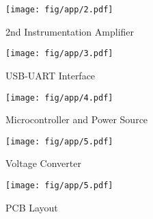 \begin{figure}[h]
	\begin{center}
	\texttt{[image: fig/app/2.pdf]}
	\end{center}
	\vspace{-4mm}
	\caption[2nd Instrumentation Amplifier]
	{2nd Instrumentation Amplifier}
	\label{fig:app2}
	\vspace{-2mm}
\end{figure}
\begin{figure}[h]
	\begin{center}
	\texttt{[image: fig/app/3.pdf]}
	\end{center}
	\vspace{-4mm}
	\caption[USB-UART Interface]
	{USB-UART Interface}
	\label{fig:app3}
	\vspace{-2mm}
\end{figure}
\begin{figure}[h]
	\begin{center}
	\texttt{[image: fig/app/4.pdf]}
	\end{center}
	\vspace{-4mm}
	\caption[Microcontroller and Power Source]
	{Microcontroller and Power Source}
	\label{fig:app4}
	\vspace{-2mm}
\end{figure}
\begin{figure}[h]
	\begin{center}
	\texttt{[image: fig/app/5.pdf]}
	\end{center}
	\vspace{-4mm}
	\caption[Voltage Converter]
	{Voltage Converter}
	\label{fig:app5}
	\vspace{-2mm}
\end{figure}
\begin{figure}[h]
	\begin{center}
	\texttt{[image: fig/app/5.pdf]}
	\end{center}
	\vspace{-4mm}
	\caption[PCB Layout]
	{PCB Layout}
	\label{fig:app6}
	\vspace{-2mm}
\end{figure}
%

